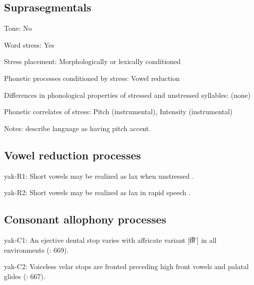 {\subsection*{Suprasegmentals}
\begin{appendixdesc}
\item[Tone:] No

\item[Word stress:] Yes

\item[Stress placement:] Morphologically or lexically conditioned

\item[Phonetic processes conditioned by stress:] Vowel reduction

\item[Differences in phonological properties of stressed and unstressed syllables:] (none)

\item[Phonetic correlates of stress:] Pitch (instrumental), Intensity (instrumental)

\item[Notes:] \citet{HargusBeavert2005} describe language as having pitch accent.
\end{appendixdesc}
\subsection*{Vowel reduction processes}
\begin{appendixdesc}

\item[yak-R1:] Short vowels may be realized as lax when unstressed \citep[40]{Jansen2010}.

\item[yak-R2:] Short vowels may be realized as lax in rapid speech \citep[40]{Jansen2010}.
\end{appendixdesc}
\subsection*{Consonant allophony processes}
\begin{appendixdesc}

\item[yak-C1:] An ejective dental stop varies with affricate variant [t͡θ’] in all environments (\citealt{RigsbyRude1996}: 669).

\item[yak-C2:] Voiceless velar stops are fronted preceding high front vowels and palatal glides (\citealt{RigsbyRude1996}: 667).
\end{appendixdesc}
}
